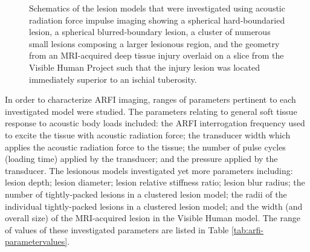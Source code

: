 \begin{figure}[!htb]
{\begin{tikzpicture}[x=0.045\textwidth, y=0.045\textwidth, draw=black, text=black, fill=black]
					\end{tikzpicture}
					\label{fig:arfi_schematic_human}
				}
				\caption[ARFI model schematics]{Schematics of the lesion models that were investigated using acoustic radiation force impulse imaging showing \protect{} a spherical hard-boundaried lesion, \protect{} a spherical blurred-boundary lesion, \protect{} a cluster of numerous small lesions composing a larger lesionous region, and \protect{} the geometry from an MRI-acquired deep tissue injury overlaid on a slice from the Visible Human Project such that the injury lesion was located immediately superior to an ischial tuberosity.}	
				\label{fig:arfi_schematics}
			\end{figure}

			In order to characterize ARFI imaging, ranges of parameters pertinent to each investigated model were studied. The parameters relating to general soft tissue response to acoustic body loads included: the ARFI interrogation frequency used to excite the tissue with acoustic radiation force; the transducer width which applies the acoustic radiation force to the tissue; the number of pulse cycles (loading time) applied by the transducer; and the pressure applied by the transducer. The lesionous models investigated yet more parameters including: lesion depth; lesion diameter; lesion relative stiffness ratio; lesion blur radius; the number of tightly-packed lesions in a clustered lesion model; the radii of the individual tightly-packed lesions in a clustered lesion model; and the width (and overall size) of the MRI-acquired lesion in the Visible Human model. The range of values of these investigated parameters are listed in Table \ref{tab:arfi-parametervalues}.

